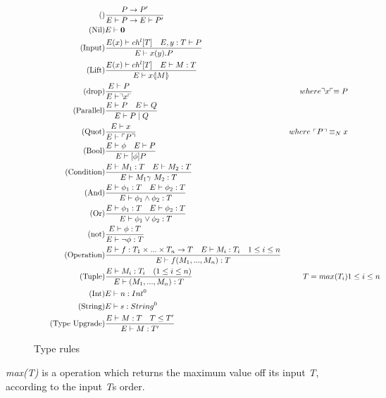 \begin{figure}
\begin{align}
\tag{} & \frac{P\rightarrow P'}{E\vdash P \rightarrow E\vdash P'}\\
\tag{Nil} &E \vdash \mathbf{0}\\
\tag{Input} &\frac{E(x) \vdash ch^l[T]\quad E,y:T\vdash P}{E \vdash x(y).P}\\
\tag{Lift} &\frac{E(x) \vdash ch^l[T] \quad E \vdash M:T}{E\vdash x \langle \! | M | \! \rangle}\\
\tag{drop} &\frac{E \vdash P}{E\vdash \urcorner x \ulcorner}& where \urcorner x \ulcorner \equiv P\\
\tag{Parallel} &\frac{E\vdash P \quad E \vdash Q}{E \vdash P \mid Q}\\
\tag{Quot} &\frac{E \vdash x}{E\vdash \ulcorner P \urcorner}& where\ \ulcorner P \urcorner \equiv_N x\\
\tag{Bool} &\frac{E\vdash \phi \quad E\vdash P}{E \vdash [\phi] P}\\
\tag{Condition} &\frac{E\vdash M_1:T \quad E\vdash M_2:T}{E\vdash M_1 \gamma\ M_2:T}\\
\tag{And} &\frac{E\vdash \phi _1:T \quad E\vdash \phi _2:T}{E\vdash \phi _1 \land \phi _2:T}\\
\tag{Or} &\frac{E\vdash \phi _1:T \quad E\vdash \phi _2:T}{E\vdash \phi _1 \lor \phi _2:T}\\
\tag{not} &\frac{E\vdash \phi :T }{E\vdash \neg \phi :T}\\
\tag{Operation} &\frac{E\vdash f:T_1\times ... \times T_n\rightarrow T\quad E\vdash M_i:T_i\quad 1\leq i \leq n}{E\vdash f(M_1,...,M_n):T}\\
\tag{Tuple} &\frac{E\vdash M_i:T_i \quad (1\leq i\leq n)}{E\vdash (M_1,...,M_n):T}&T = max(T_i)& 1\leq i\leq n\\
\tag{Int} &E\vdash n: Int^0\\
\tag{String} &E\vdash s:String^0\\
\tag{Type Upgrade} &\frac{E\vdash M:T \quad T\leq T'}{E\vdash M:T'}
\end{align}
\caption{Type rules}
\label{fig:typerules}
\end{figure}

\textit{max(T)} is a operation which returns the maximum value off its input \textit{T}, according to the input \textit{T}s order.

%
%

\FloatBarrier
